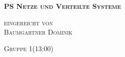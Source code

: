 \documentclass[12pt,a4paper]{report}
\theoremstyle{definition}
\begin{document}

\begin{titlepage}
	\begin{center}
		
		\vspace*{1.0cm}
		\huge
		\textsc{\bf{PS Netze und Verteilte Systeme}}
		
		\vspace*{4.0cm}
		\textsc{
			\normalsize{eingereicht von} \\[0.5\baselineskip]
			{\large Baumgartner Dominik}
		}
		
		\vspace*{3.0cm}
		\textsc{
			\normalsize{Gruppe 1(13:00)}
		}
		
	\end{center}
	
\end{titlepage}
\end{document}
